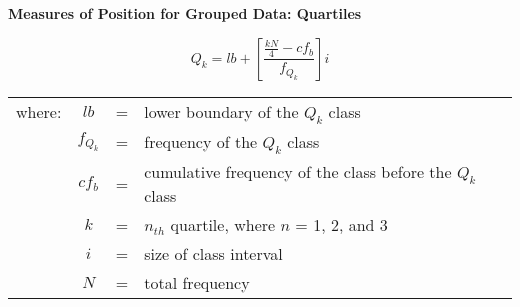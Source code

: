 \begin{center}
\textbf{Measures of Position for Grouped Data: Quartiles}
\end{center}

\vspace*{1ex}

\[
Q_k=lb + \left[\displaystyle \frac{\displaystyle \frac{kN}{4} - cf_b}{f_{Q_k}} \right]i
\] 


\begin{center}
\begin{tabular}{lcll}
where: & $lb$ & = & lower boundary of the $Q_k$ class \\
 & $f_{Q_k} $& = & frequency of the $Q_k$ class \\
& $cf_b$ & = & \makecell[tl]{cumulative frequency of the  class \\ before  the $Q_k$ class} \\ 
& $k $ & = & $n_{th} $ quartile, where $n$ = 1, 2, and 3 \\ 
& $i$ & = & size of class interval\\ 
& $N$ & = & total frequency \\ 
\end{tabular} 
\end{center}